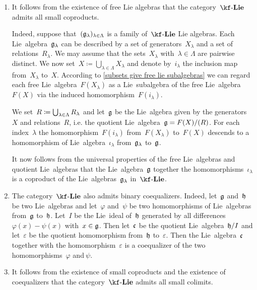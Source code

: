 \begin{remark}
  \label{existence of small colimits}
  \leavevmode
  \begin{enumerate}
    \item
      It follows from the existence of free Lie algebras that the category~$\cLie{\kf}$ admits all small coproducts.

      Indeed, suppose that~$(\mathfrak{g}_\lambda)_{\lambda \in \Lambda}$ is a family of~$\cLie{\kf}$ Lie algebras.
      Each Lie~algebra~$\mathfrak{g}_\lambda$ can be described by a set of generators~$X_\lambda$ and a set of relations~$R_\lambda$.
      We may assume that the sets~$X_\lambda$ with~$\lambda \in \Lambda$ are pairwise distinct.
      We now set~$X \coloneqq \bigcup_{\lambda \in \Lambda} X_\lambda$ and denote by~$i_\lambda$ the inclusion map from~$X_\lambda$ to~$X$.
      According to \cref{subsets give free lie subalgebras} we can regard each free Lie~algebra~$F(X_\lambda)$ as a Lie~subalgebra of the free Lie~algebra~$F(X)$ via the induced homomorphism~$F(i_\lambda)$.

      We set~$R \coloneqq \bigcup_{\lambda \in \Lambda} R_\lambda$ and let~$\mathfrak{g}$ be the Lie~algebra given by the generators~$X$ and relations~$R$, i.e. the quotient Lie~algebra~$\mathfrak{g} = F(X) / \lparen R \rparen$.
      For each index~$\lambda$ the homomorphism~$F(i_\lambda)$ from~$F(X_\lambda)$ to~$F(X)$ descends to a homomorphism of Lie~algebra~$\iota_\lambda$ from~$\mathfrak{g}_\lambda$ to~$\mathfrak{g}$.

      It now follows from the universal properties of the free Lie~algebras and quotient Lie~algebras that the Lie~algebra~$\mathfrak{g}$ together the homomorphisms~$\iota_\lambda$ is a coproduct of the Lie~algebras~$\mathfrak{g}_\lambda$ in~$\cLie{\kf}$.
    \item
      The category~$\cLie{\kf}$ also admits binary coequalizers.
      Indeed, let~$\mathfrak{g}$ and~$\mathfrak{h}$ be two Lie~algebras and let~$\varphi$ and~$\psi$ be two homomorphisms of Lie~algebras from~$\mathfrak{g}$ to~$\mathfrak{h}$.
      Let~$I$ be the Lie~ideal of~$\mathfrak{h}$ generated by all differences~$\varphi(x) - \psi(x)$ with~$x \in \mathfrak{g}$.
      Then let~$\mathfrak{c}$ be the quotient Lie~algebra~$\mathfrak{h} / I$ and let~$\varepsilon$ be the quotient homomorphism from~$\mathfrak{h}$ to~$\varepsilon$.
      Then the Lie~algebra~$\mathfrak{c}$ together with the homomorphism~$\varepsilon$ is a coequalizer of the two homomorphisms~$\varphi$ and$~\psi$.
    \item
      It follows from the existence of small coproducts and the existence of coequalizers that the category~$\cLie{\kf}$ admits all small colimits.
  \end{enumerate}
\end{remark}




